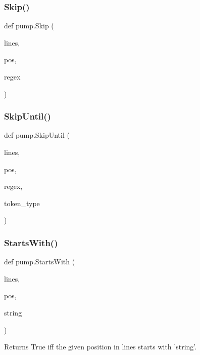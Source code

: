 \subsubsection{\texorpdfstring{Skip()}{Skip()}}
{\footnotesize\ttfamily def pump.\+Skip (\begin{DoxyParamCaption}\item[{}]{lines,  }\item[{}]{pos,  }\item[{}]{regex }\end{DoxyParamCaption})}

\mbox{\label{namespacepump_a8935d04d89047866b07c59845e2d7d29}} 
\subsubsection{\texorpdfstring{Skip\+Until()}{SkipUntil()}}
{\footnotesize\ttfamily def pump.\+Skip\+Until (\begin{DoxyParamCaption}\item[{}]{lines,  }\item[{}]{pos,  }\item[{}]{regex,  }\item[{}]{token\+\_\+type }\end{DoxyParamCaption})}

\mbox{\label{namespacepump_a9353db466a97e632058887a77c3b26aa}} 
\subsubsection{\texorpdfstring{Starts\+With()}{StartsWith()}}
{\footnotesize\ttfamily def pump.\+Starts\+With (\begin{DoxyParamCaption}\item[{}]{lines,  }\item[{}]{pos,  }\item[{}]{string }\end{DoxyParamCaption})}

\begin{DoxyVerb}Returns True iff the given position in lines starts with 'string'.\end{DoxyVerb}
 \mbox{\label{namespacepump_a8c50cb40d65f26771c6f51eb265bb569}} 
